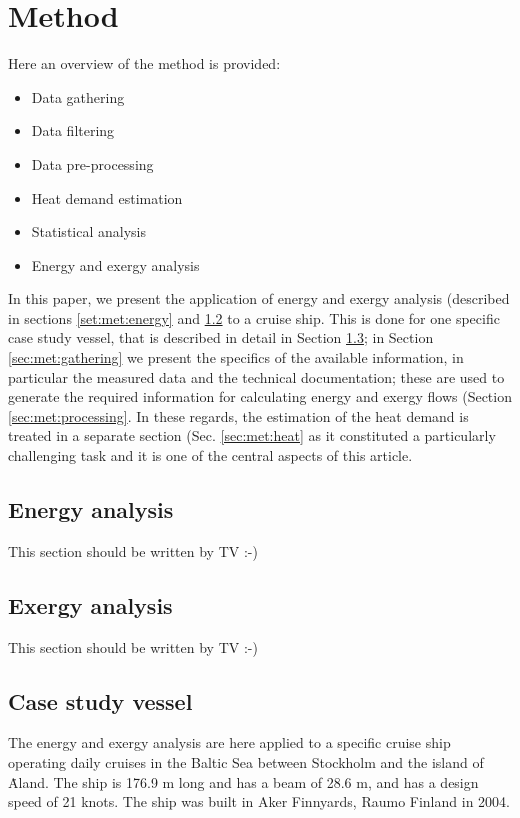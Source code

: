 \documentclass[preprint,12pt]{elsarticle}
\begin{document}
\section{Method} \label{sec:method}

Here an overview of the method is provided: 
\begin{itemize}
	\item Data gathering
	\item Data filtering
	\item Data pre-processing
	\item Heat demand estimation
	\item Statistical analysis
	\item Energy and exergy analysis
\end{itemize}

In this paper, we present the application of energy and exergy analysis (described in sections \ref{set:met:energy} and \ref{sec:met:exergy} to a cruise ship. This is done for one specific case study vessel, that is described in detail in Section \ref{sec:met:case}; in Section \ref{sec:met:gathering} we present the specifics of the available information, in particular the measured data and the technical documentation; these are used to generate the required information for calculating energy and exergy flows (Section \ref{sec:met:processing}. In these regards, the estimation of the heat demand is treated in a separate section (Sec. \ref{sec:met:heat} as it constituted a particularly challenging task and it is one of the central aspects of this article. 

\subsection{Energy analysis} \label{sec:met:energy}

This section should be written by TV :-)

\subsection{Exergy analysis} \label{sec:met:exergy}

This section should be written by TV :-)

\subsection{Case study vessel} \label{sec:met:case}

The energy and exergy analysis are here applied to a specific  cruise ship operating daily cruises in the Baltic Sea between Stockholm and the island of \.{A}land. The ship is 176.9 m long and has a beam of 28.6 m, and has a design speed of 21 knots. The ship was built in Aker Finnyards, Raumo Finland in 2004.
\end{document}
